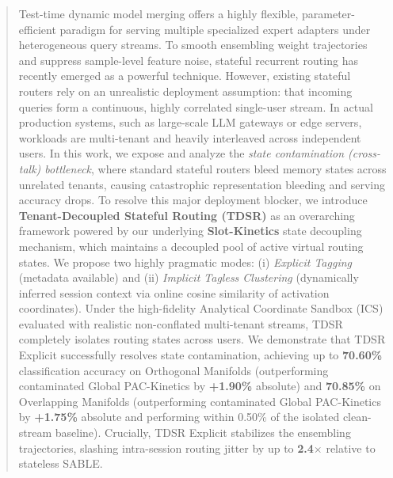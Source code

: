 \begin{abstract}
Test-time dynamic model merging offers a highly flexible, parameter-efficient paradigm for serving multiple specialized expert adapters under heterogeneous query streams. To smooth ensembling weight trajectories and suppress sample-level feature noise, stateful recurrent routing has recently emerged as a powerful technique. However, existing stateful routers rely on an unrealistic deployment assumption: that incoming queries form a continuous, highly correlated single-user stream. In actual production systems, such as large-scale LLM gateways or edge servers, workloads are multi-tenant and heavily interleaved across independent users. In this work, we expose and analyze the \emph{state contamination (cross-talk) bottleneck}, where standard stateful routers bleed memory states across unrelated tenants, causing catastrophic representation bleeding and serving accuracy drops. To resolve this major deployment blocker, we introduce \textbf{Tenant-Decoupled Stateful Routing (TDSR)} as an overarching framework powered by our underlying \textbf{Slot-Kinetics} state decoupling mechanism, which maintains a decoupled pool of active virtual routing states. We propose two highly pragmatic modes: (i) \emph{Explicit Tagging} (metadata available) and (ii) \emph{Implicit Tagless Clustering} (dynamically inferred session context via online cosine similarity of activation coordinates). Under the high-fidelity Analytical Coordinate Sandbox (ICS) evaluated with realistic non-conflated multi-tenant streams, TDSR completely isolates routing states across users. We demonstrate that TDSR Explicit successfully resolves state contamination, achieving up to \textbf{70.60\%} classification accuracy on Orthogonal Manifolds (outperforming contaminated Global PAC-Kinetics by \textbf{+1.90\%} absolute) and \textbf{70.85\%} on Overlapping Manifolds (outperforming contaminated Global PAC-Kinetics by \textbf{+1.75\%} absolute and performing within 0.50\% of the isolated clean-stream baseline). Crucially, TDSR Explicit stabilizes the ensembling trajectories, slashing intra-session routing jitter by up to \textbf{2.4$\times$} relative to stateless SABLE.
\end{abstract}